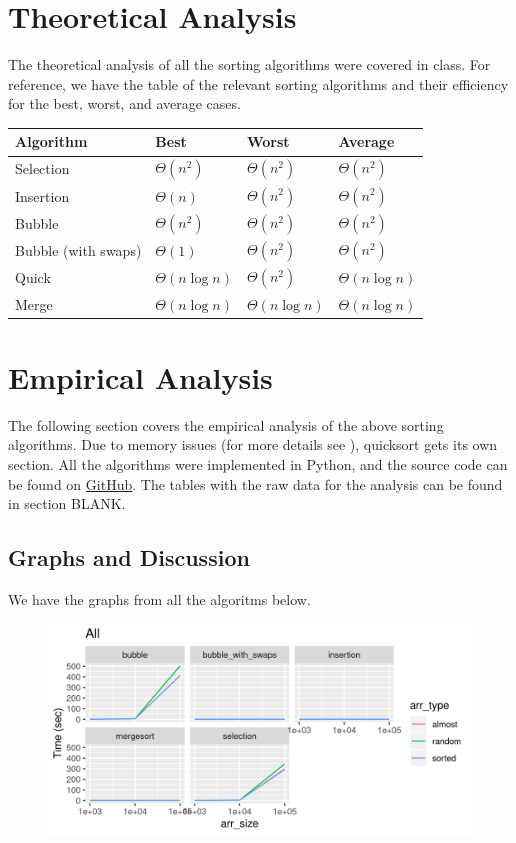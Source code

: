 \documentclass[letterpaper, 11pt]{article}
\begin{document}
\section{Theoretical Analysis}
The theoretical analysis of all the sorting algorithms were covered in class.
For reference, we have the table of the relevant sorting algorithms and their
efficiency for the best, worst, and average cases. 

\begin{center}
\begin{tabular}{l | l l l}
  Algorithm & Best  & Worst  & Average  \\
  \hline
  Selection & \(\Theta(n^2)\) & \(\Theta(n^2)\) & \(\Theta(n^2)\) \\
  Insertion & \(\Theta(n)\) & \(\Theta(n^2)\) & \(\Theta(n^2)\) \\
  Bubble & \(\Theta(n^2)\) & \(\Theta(n^2)\) & \(\Theta(n^2)\) \\
  Bubble (with swaps) & \(\Theta(1)\) & \(\Theta(n^2)\) & \(\Theta(n^2)\) \\
  Quick & \(\Theta(n \log n)\) & \(\Theta(n^2)\) & \(\Theta(n\log n)\) \\
  Merge & \(\Theta(n \log n)\) & \(\Theta(n\log n)\) & \(\Theta(n\log n)\) \\
\end{tabular}
\end{center}

\section{Empirical Analysis}
The following section covers the empirical analysis of the above sorting
algorithms. Due to memory issues (for more details see ), quicksort gets its
own section. All the algorithms were implemented in Python, and the source code
can be found on
\href{https://github.com/gwallace04/cs3130/blob/master/projects/proj2/proj2.py}
{GitHub}. The tables with the raw data for the analysis can be found in section
BLANK.

\subsection{Graphs and Discussion}
We have the graphs from all the algoritms below.
\begin{figure}[h]
  \includegraphics[width=\linewidth]{all.png}
\end{figure}
\end{document}
